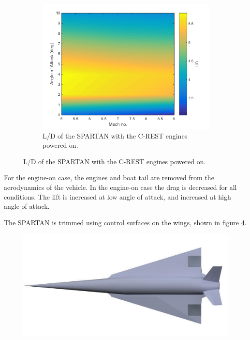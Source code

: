 \begin{figure}
\begin{subfigure}{.5\textwidth}
	\label{fig:Cd-EngineOn}
\end{subfigure}
\begin{subfigure}{.5\textwidth}
	\centering
	\includegraphics[width=0.99\linewidth]{figures/3_vehicle_design/LD-EngineOn}
	\caption{L/D of the SPARTAN with the C-REST engines powered on.}
	\label{fig:LD-EngineOn}
\end{subfigure}
\end{figure}

For the engine-on case, the engines and boat tail are removed from the aerodynamics of the vehicle. In the engine-on case the drag is decreased for all conditions. The lift is increased at low angle of attack, and increased at high angle of attack.




The SPARTAN is trimmed using control surfaces on the wings, shown in figure \ref{fig:SPARTAN_FLAPS}. 

\begin{figure}
	\centering
	\includegraphics[width=0.7\linewidth]{figures/3_vehicle_design/SPARTAN_FLAPS}
	\caption{}
	\label{fig:SPARTAN_FLAPS}
\end{figure}


